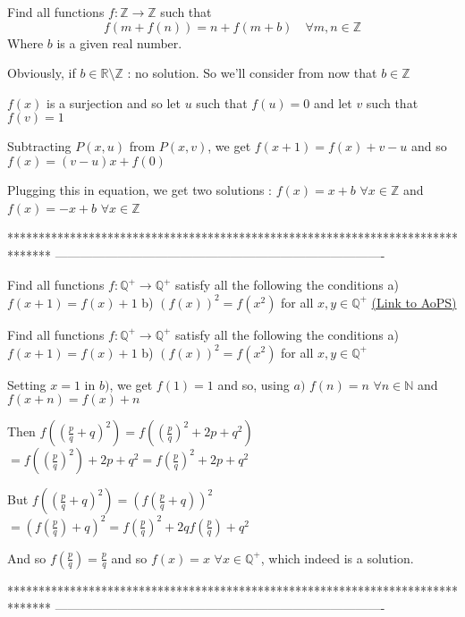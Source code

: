 \begin{solution}
	\begin{tcolorbox}Find all functions $f: \mathbb{Z}\to\mathbb{Z}$ such that \[f(m+f(n))=n+f(m+b)\quad \forall m,n\in\mathbb Z\]
Where $b$ is a given real number.\end{tcolorbox}
Obviously, if $b\in\mathbb R\setminus\mathbb Z$ : no solution.
So we'll consider from now that $b\in\mathbb Z$

$f(x)$ is a surjection and so let $u$ such that $f(u)=0$ and let $v$ such that $f(v)=1$ 

Subtracting $P(x,u)$ from $P(x,v)$, we get $f(x+1)=f(x)+v-u$ and so $f(x)=(v-u)x+f(0)$

Plugging this in equation, we get two solutions : 
$\boxed{f(x)=x+b}$ $\forall x\in\mathbb Z$ and $\boxed{f(x)=-x+b}$ $\forall x\in\mathbb Z$
\end{solution}
*******************************************************************************
-------------------------------------------------------------------------------

\begin{problem}
	Find all functions $f: \mathbb{Q}^+\to\mathbb{Q}^+$ satisfy all the following the conditions
a) $f(x+1)=f(x)+1$
b) $(f(x))^2=f(x^2)$
for all $x,y\in\mathbb{Q}^+$
	\flushright \href{https://artofproblemsolving.com/community/c6h569381}{(Link to AoPS)}
\end{problem}



\begin{solution}
	\begin{tcolorbox}Find all functions $f: \mathbb{Q}^+\to\mathbb{Q}^+$ satisfy all the following the conditions
a) $f(x+1)=f(x)+1$
b) $(f(x))^2=f(x^2)$
for all $x,y\in\mathbb{Q}^+$\end{tcolorbox}
Setting $x=1$ in $b)$, we get $f(1)=1$ and so, using $a)$ $f(n)=n$ $\forall n\in \mathbb N$ and $f(x+n)=f(x)+n$

Then $f((\frac pq+q)^2)=f((\frac pq)^2+2p+q^2)$ $=f((\frac pq)^2)+2p+q^2=f(\frac pq)^2+2p+q^2$

But $f((\frac pq+q)^2)=(f(\frac pq+q))^2$ $=(f(\frac pq)+q)^2=f(\frac pq)^2+2qf(\frac pq)+q^2$

And so $f(\frac pq)=\frac pq$ and so $\boxed{f(x)=x}$ $\forall x\in\mathbb Q^+$, which indeed is a solution.
\end{solution}
*******************************************************************************
-------------------------------------------------------------------------------

